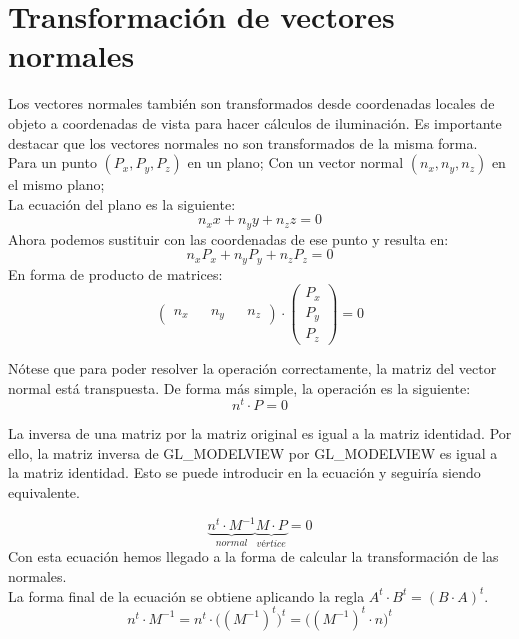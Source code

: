 \section{Transformación de vectores normales}
Los vectores normales también son transformados desde coordenadas locales de objeto a coordenadas de vista para hacer cálculos de iluminación.
Es importante destacar que los vectores normales no son transformados de la misma forma.
\\
Para un punto $(P_x, P_y, P_z)$ en un plano;
Con un vector normal $(n_x, n_y, n_z)$ en el mismo plano;
\\
La ecuación del plano es la siguiente:
\begin{equation*}
  n_xx + n_yy + n_zz  = 0
\end{equation*}
Ahora podemos sustituir con las coordenadas de ese punto y resulta en:
\begin{equation*}
    n_xP_x + n_yP_y + n_zP_z  = 0
\end{equation*}
En forma de producto de matrices:
\begin{equation*}
  \begin{pmatrix}
    n_x && n_y && n_z
  \end{pmatrix}
  \cdot
  \begin{pmatrix}
    P_x \\ P_y \\ P_z
  \end{pmatrix}
  = 0
\end{equation*}

Nótese que para poder resolver la operación correctamente, la matriz del vector normal está transpuesta. De forma más simple, la operación es la siguiente:
\begin{equation*}
  n^t \cdot P = 0
\end{equation*}

La inversa de una matriz por la matriz original es igual a la matriz identidad. Por ello, la matriz inversa de GL\_MODELVIEW por GL\_MODELVIEW es igual a la matriz identidad. Esto se puede introducir en la ecuación y seguiría siendo equivalente.

\begin{equation*}
  \underbrace{n^t \cdot M^{-1}}_{normal} \underbrace{M \cdot P}_{vértice} = 0
\end{equation*}
Con esta ecuación hemos llegado a la forma de calcular la transformación de las normales. \\

\newpage
La forma final de la ecuación se obtiene aplicando la regla $A^t \cdot B^t = (B \cdot A)^t$.
\begin{equation*}
  n^t \cdot M^{-1} = n^t \cdot \Big((M^{-1})^t\Big)^t = \Big((M^{-1})^t\cdot n\Big)^t
  \end{equation*}


